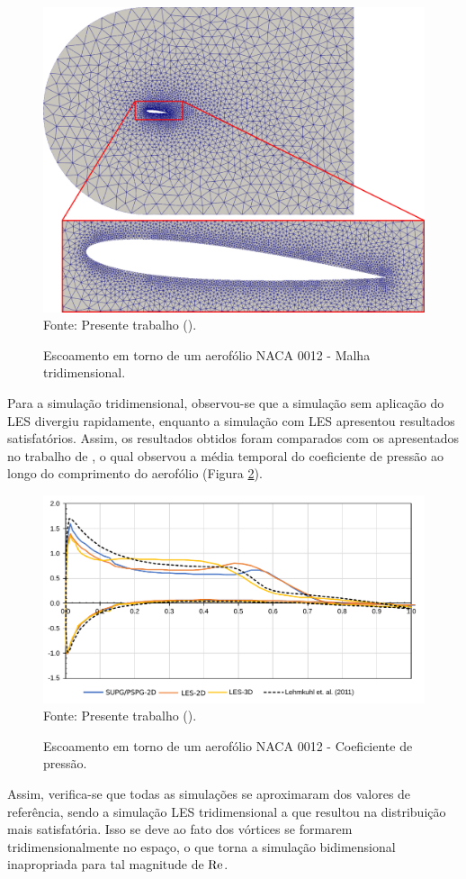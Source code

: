 \begin{figure}[h!]
    \centering
    \caption{Escoamento em torno de um aerofólio NACA 0012 - Malha tridimensional.}
    \includegraphics[width=.7\linewidth]{Figuras/NACA0012/mesh3D.png}
    \\Fonte: Presente trabalho (\the\year).
    \label{fig:NACA0012-mesh3D}
\end{figure}

Para a simulação tridimensional, observou-se que a simulação sem aplicação do LES divergiu rapidamente, enquanto a simulação com LES apresentou resultados satisfatórios. Assim, os resultados obtidos foram comparados com os apresentados no trabalho de , o qual observou a média temporal do coeficiente de pressão ao longo do comprimento do aerofólio (Figura \ref{fig:NACA0012-Cp}).

\begin{figure}[h!]
    \centering
    \caption{Escoamento em torno de um aerofólio NACA 0012 - Coeficiente de pressão.}
    \includegraphics[width=.7\linewidth]{Figuras/NACA0012/Cp.pdf}
    \\Fonte: Presente trabalho (\the\year).
    \label{fig:NACA0012-Cp}
\end{figure}

Assim, verifica-se que todas as simulações se aproximaram dos valores de referência, sendo a simulação LES tridimensional a que resultou na distribuição mais satisfatória. Isso se deve ao fato dos vórtices se formarem tridimensionalmente no espaço, o que torna a simulação bidimensional inapropriada para tal magnitude de $\mathrm{Re}$.

